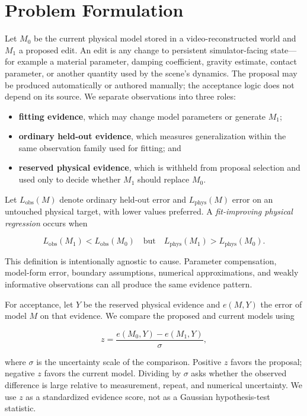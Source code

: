 \documentclass[acmtog]{acmart}
\begin{document}
\section{Problem Formulation}\label{problem-formulation}

Let \(M_0\) be the current physical model stored in a video-reconstructed world and \(M_1\) a proposed edit. An edit is any change to persistent simulator-facing state---for example a material parameter, damping coefficient, gravity estimate, contact parameter, or another quantity used by the scene's dynamics. The proposal may be produced automatically or authored manually; the acceptance logic does not depend on its source. We separate observations into three roles:

\begin{itemize}[leftmargin=*]
\item \textbf{fitting evidence}, which may change model parameters or generate \(M_1\);
\item \textbf{ordinary held-out evidence}, which measures generalization within the same observation family used for fitting; and
\item \textbf{reserved physical evidence}, which is withheld from proposal selection and used only to decide whether \(M_1\) should replace \(M_0\).
\end{itemize}

Let \(L_{\mathrm{obs}}(M)\) denote ordinary held-out error and \(L_{\mathrm{phys}}(M)\) error on an untouched physical target, with lower values preferred. A \emph{fit-improving physical regression} occurs when

\[
L_{\mathrm{obs}}(M_1) < L_{\mathrm{obs}}(M_0)
\quad\text{but}\quad
L_{\mathrm{phys}}(M_1) > L_{\mathrm{phys}}(M_0).
\]

This definition is intentionally agnostic to cause. Parameter compensation, model-form error, boundary assumptions, numerical approximations, and weakly informative observations can all produce the same evidence pattern.

For acceptance, let \(Y\) be the reserved physical evidence and \(e(M,Y)\) the error of model \(M\) on that evidence. We compare the proposed and current models using

\[
z =
\frac{e(M_0,Y)-e(M_1,Y)}
     {\sigma},
\]

where \(\sigma\) is the uncertainty scale of the comparison. Positive \(z\) favors the proposal; negative \(z\) favors the current model. Dividing by \(\sigma\) asks whether the observed difference is large relative to measurement, repeat, and numerical uncertainty. We use \(z\) as a standardized evidence score, not as a Gaussian hypothesis-test statistic.
\end{document}
